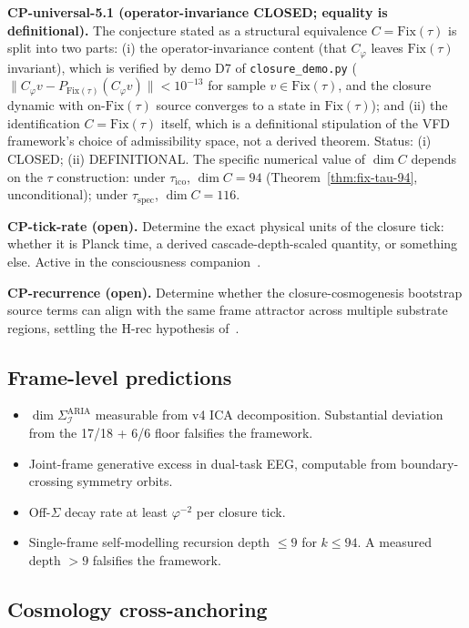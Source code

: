 \documentclass[11pt]{article}
\theoremstyle{plain}
\theoremstyle{definition}
\theoremstyle{remark}
\newcommand{\Ical}{\mathcal{I}}
\newcommand{\Fix}{\mathrm{Fix}}
\newcommand{\Cph}{C_\varphi}
\begin{document}
\textbf{CP-universal-5.1 (operator-invariance CLOSED; equality is definitional).} The conjecture stated as a structural equivalence $C = \Fix(\tau)$ is split into two parts: (i) the operator-invariance content (that $\Cph$ leaves $\Fix(\tau)$ invariant), which is verified by demo D7 of \texttt{closure\_demo.py} ($\|C_\varphi v - P_{\Fix(\tau)}(C_\varphi v)\| < 10^{-13}$ for sample $v \in \Fix(\tau)$, and the closure dynamic with on-$\Fix(\tau)$ source converges to a state in $\Fix(\tau)$); and (ii) the identification $C = \Fix(\tau)$ itself, which is a definitional stipulation of the VFD framework's choice of admissibility space, not a derived theorem. Status: (i) CLOSED; (ii) DEFINITIONAL. The specific numerical value of $\dim C$ depends on the $\tau$ construction: under $\tau_{\mathrm{ico}}$, $\dim C = 94$ (Theorem~\ref{thm:fix-tau-94}, unconditional); under $\tau_{\mathrm{spec}}$, $\dim C = 116$.

\textbf{CP-tick-rate (open).} Determine the exact physical units of the closure tick: whether it is Planck time, a derived cascade-depth-scaled quantity, or something else. Active in the consciousness companion~\citep{SmartProcessingToPOV}.

\textbf{CP-recurrence (open).} Determine whether the closure-cosmogenesis bootstrap source terms can align with the same frame attractor across multiple substrate regions, settling the H-rec hypothesis of~\citep{SmartCosmicClosure}.

\subsection{Frame-level predictions}

\begin{itemize}[leftmargin=2em]
\item $\dim \Sigma_\Ical^{\mathrm{ARIA}}$ measurable from v4 ICA decomposition. Substantial deviation from the 17/18 + 6/6 floor falsifies the framework.
\item Joint-frame generative excess in dual-task EEG, computable from boundary-crossing symmetry orbits.
\item Off-$\Sigma$ decay rate at least $\varphi^{-2}$ per closure tick.
\item Single-frame self-modelling recursion depth $\leq 9$ for $k \leq 94$. A measured depth $> 9$ falsifies the framework.
\end{itemize}

\subsection{Cosmology cross-anchoring}
\end{document}
